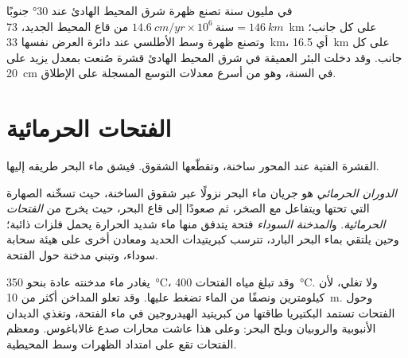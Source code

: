\begin{example}\label{ex:g11:ocean-ridges:rates}
في مليون سنة تصنع ظهرة شرق المحيط الهادئ عند \ang{30} جنوبًا
$\qty{14.6}{cm/yr} \times 10^6\ \text{سنة} = \qty{146}{km}$ من قاع
المحيط الجديد، \qty{73}{km} على كل جانب؛ وتصنع ظهرة وسط الأطلسي عند دائرة العرض نفسها
\qty{33}{km}، أي \qty{16.5}{km} على كل جانب. وقد دخلت البئر العميقة في شرق
المحيط الهادئ قشرة صُنعت بمعدل يزيد على \qty{20}{cm} في السنة، وهو من
أسرع معدلات التوسع المسجلة على الإطلاق.
\end{example}

\section{الفتحات الحرمائية}

القشرة الفتية عند المحور ساخنة، وتقطّعها الشقوق. فيشق ماء البحر
طريقه إليها.

\begin{definition}\label{def:g11:ocean-ridges:hydrothermal}
\emph{الدوران الحرمائي} هو جريان
ماء البحر نزولًا عبر شقوق  الساخنة، حيث
تسخّنه الصهارة التي تحتها ويتفاعل مع الصخر، ثم صعودًا إلى قاع
البحر، حيث يخرج من \emph{الفتحات الحرمائية}. و\emph{المدخنة
السوداء} فتحة يتدفق منها ماء شديد الحرارة يحمل
فلزات ذائبة؛ وحين يلتقي بماء البحر البارد، تترسب كبريتيدات الحديد
ومعادن أخرى على هيئة سحابة سوداء، وتبني مدخنة حول
الفتحة.
\end{definition}

يغادر ماء  مدخنته عادة بنحو
\qty{350}{\celsius}، وقد تبلغ مياه الفتحات \qty{400}{\celsius}. ولا
تغلي، لأن كيلومترين ونصفًا من الماء تضغط عليها. وقد
تعلو المداخن أكثر من \qty{10}{m}. وحول الفتحات تستمد البكتيريا
طاقتها من كبريتيد الهيدروجين في ماء الفتحة، وتغذي الديدان الأنبوبية
والروبيان وبلح البحر: وعلى هذا عاشت محارات صدع غالاباغوس. ومعظم
الفتحات تقع على امتداد الظهرات وسط المحيطية.

